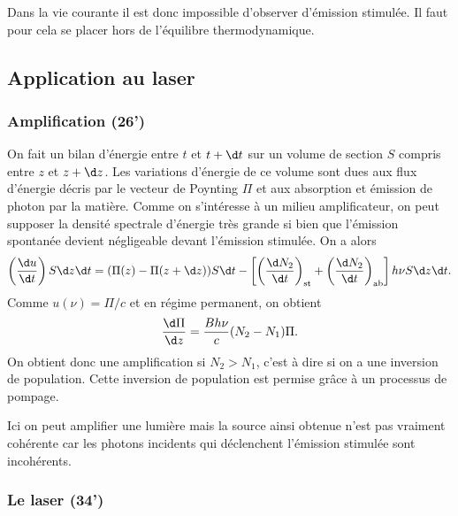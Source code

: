 \begin{transition}
Dans la vie courante il est donc impossible d'observer d'émission stimulée.
Il faut pour cela se placer hors de l'équilibre thermodynamique.
\end{transition}

\subsection{Application au laser}

\subsubsection{Amplification (26')}

On fait un bilan d'énergie entre $t$ et $t+\d t$ sur un volume de section $S$ compris entre $z$ et $z+\d z$.
Les variations d'énergie de ce volume sont dues aux flux d'énergie décris par le vecteur de Poynting $\Pi$ et aux absorption et émission de photon par la matière.
Comme on s'intéresse à un milieu amplificateur, on peut supposer la densité spectrale d'énergie très grande si bien que l'émission spontanée devient négligeable devant l'émission stimulée.
On a alors
\begin{equation}
\left(\frac{\d u}{\d t}\right) S\d z \d t = (\Pi(z) - \Pi(z+\d z))S \d t - \left[ \left(\frac{\d N_2}{\d t}\right)_\mathrm{st} + \left(\frac{\d N_2}{\d t}\right)_\mathrm{ab} \right] h\nu S \d z \d t.
\end{equation}
Comme $u(\nu) = \Pi/c$ et en régime permanent, on obtient
\begin{equation}
\frac{\d\Pi}{\d z} = \frac{Bh\nu}{c}(N_2-N_1)\Pi.
\end{equation}
On  obtient donc une amplification si $N_2>N_1$, c'est à dire si on a une inversion de population.
Cette inversion de population est permise grâce à un processus de pompage.

\begin{transition}
Ici on peut amplifier une lumière mais la source ainsi obtenue n'est pas vraiment cohérente car les photons incidents qui déclenchent l'émission stimulée sont incohérents.
\end{transition}

\subsubsection{Le laser (34')}

